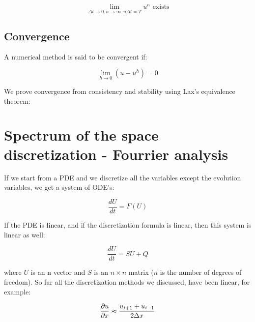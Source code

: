 \begin{equation}
\lim _{\Delta t \rightarrow 0, n \rightarrow \infty, n\Delta t = T} u ^n \mbox{ exists}
\end{equation}


\subsection{Convergence}
A numerical method is said to be convergent if: 

\begin{equation}
\lim _{h\rightarrow 0} (u - u^h) = 0
\end{equation}

We prove convergence from consistency and stability using Lax's equivalence theorem: \\


\section{Spectrum of the space discretization - Fourrier analysis}
If we start from a PDE and we discretize all the variables except the evolution variables, we get a system of ODE's: 

\begin{equation}
\frac{d U}{d t} = F(U)
\end{equation}

If the PDE is linear, and if the discretization formula is linear, then this system is linear as well: 

\begin{equation}
\frac{d U}{dt} = SU + Q
\end{equation}

where $U$ is an n vector and $S$ is an $n\times n$ matrix ($n$ is the number of degrees of freedom). So far all the discretization methods we discussed, have been linear, for example: 

\begin{equation}
\frac{\partial u}{\partial x} \approx \frac{u_{i+1}+u_{i-1}}{2\Delta x}
\end{equation}

